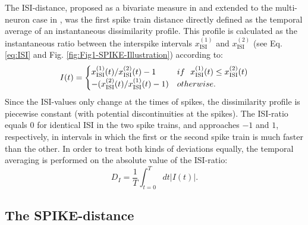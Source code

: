 \documentclass[10pt,twocolumn]{elsart5p}
\begin{document}
The ISI-distance, proposed as a bivariate measure in \citep{Kreuz07c} and extended to the multi-neuron case in \citep{Kreuz09}, was the first spike train distance directly defined as the temporal average of an instantaneous dissimilarity profile. This profile is calculated as the instantaneous ratio between the interspike intervals $x_{\mathrm {ISI}}^{(1)}$ and $x_{\mathrm {ISI}}^{(2)}$ (see Eq. \ref{eq:ISI} and Fig. \ref{fig:Fig1-SPIKE-Illustration}) according to:
%
\begin{equation} \label{eq:ISI-Ratio}
    I (t) = \begin{cases}
           x_{\mathrm {ISI}}^{(1)} (t) / x_{\mathrm {ISI}}^{(2)} (t) - 1 & {\rm if} ~~ x_{\mathrm {ISI}}^{(1)} (t) \leq x_{\mathrm {ISI}}^{(2)} (t) \cr
                      - (x_{\mathrm {ISI}}^{(2)} (t) / x_{\mathrm {ISI}}^{(1)} (t) -1)     & {\rm otherwise}.
                  \end{cases}
\end{equation}
%
Since the ISI-values only change at the times of spikes, the dissimilarity profile is piecewise constant (with potential discontinuities at the spikes). The ISI-ratio equals $0$ for identical ISI in the two spike trains, and approaches $-1$ and $1$, respectively, in intervals in which the first or the second spike train is much faster than the other. In order to treat both kinds of deviations equally, the temporal averaging is performed on the absolute value of the ISI-ratio:
%
\begin{equation} \label{eq:Temporal-Average}
    D_I = \frac{1}{T} \int_{t=0}^T dt |I (t)|.
\end{equation}


\subsection{\label{ss:SPIKE-Distance} The SPIKE-distance}
\end{document}
